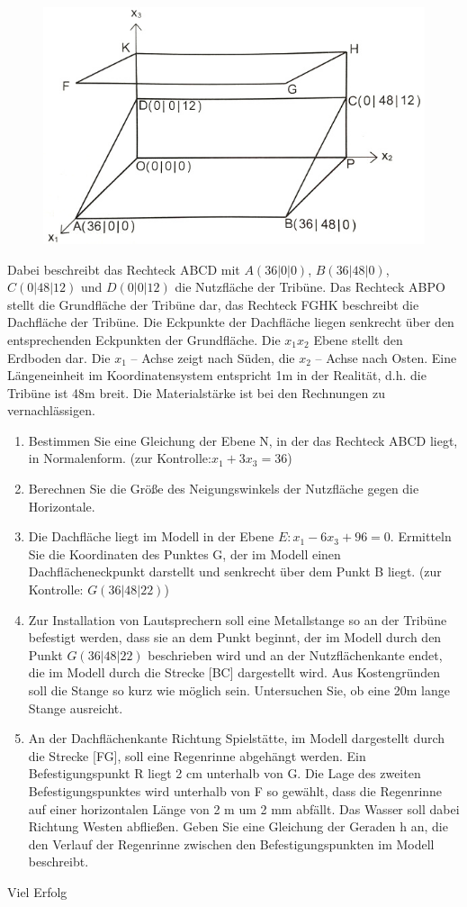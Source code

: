 \documentclass[a4paper,12pt]{article}
\begin{document}
\begin{figure}[h!]
  \begin{center}
    \includegraphics[width=0.5\linewidth]{tribüne.jpg}
  \end{center}
\end{figure}


\enlargethispage{2cm}

Dabei beschreibt das Rechteck ABCD mit
  $A (36|0|0)$, $ B (36|48|0)$, $C (0|48|12)$ und $ D (0|0|12) $
die Nutzfläche der Tribüne. Das Rechteck ABPO stellt die Grundfläche der Tribüne dar, das
Rechteck FGHK beschreibt die Dachfläche der Tribüne. Die Eckpunkte der Dachfläche liegen
senkrecht über den entsprechenden Eckpunkten der Grundfläche.
Die $x_1x_2 $  Ebene stellt den Erdboden dar. Die $ x_1$ – Achse zeigt nach Süden, die $x_2$ – Achse nach
Osten. Eine Längeneinheit im Koordinatensystem entspricht 1m in der Realität, d.h. die Tribüne ist
48m breit. Die Materialstärke ist bei den Rechnungen zu vernachlässigen.
\begin{enumerate}[label={\alph*)}]
\item  Bestimmen Sie eine Gleichung der Ebene N, in der das Rechteck ABCD liegt, in
Normalenform. (zur Kontrolle:$ x_1 + 3x_3 = 36 $)
\item Berechnen Sie die Größe des Neigungswinkels der Nutzfläche gegen die Horizontale.
\item Die Dachfläche liegt im Modell in der Ebene $E: x_1 - 6x_3 + 96 = 0.$
Ermitteln Sie die Koordinaten des Punktes G, der im Modell einen Dachflächeneckpunkt
darstellt und senkrecht über dem Punkt B liegt. (zur Kontrolle: $G (36|48|22)$)
\item Zur Installation von Lautsprechern soll eine Metallstange so an der Tribüne befestigt
werden, dass sie an dem Punkt beginnt, der im Modell durch den Punkt $G (36|48|22)$  beschrieben wird
und an der Nutzflächenkante endet, die im Modell durch die Strecke [BC] dargestellt wird.
Aus Kostengründen soll die Stange so kurz wie möglich sein. Untersuchen Sie, ob eine 20m
lange Stange ausreicht.
\item An der Dachflächenkante Richtung Spielstätte, im Modell dargestellt durch die Strecke
[FG], soll eine Regenrinne abgehängt werden. Ein Befestigungspunkt R liegt 2 cm
unterhalb von G. Die Lage des zweiten Befestigungspunktes wird unterhalb von F so
gewählt, dass die Regenrinne auf einer horizontalen Länge von 2 m um 2 mm abfällt. Das
Wasser soll dabei Richtung Westen abfließen. Geben Sie eine Gleichung der Geraden h an,
die den Verlauf der Regenrinne zwischen den Befestigungspunkten im Modell beschreibt.
\end{enumerate}
\vspace{0,8cm}


\centerline{Viel Erfolg}
\end{document}
